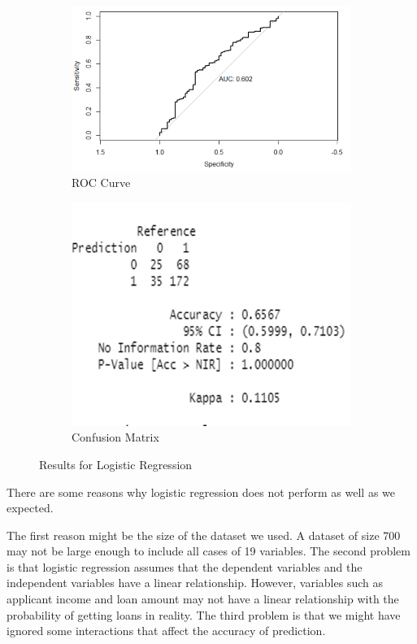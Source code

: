 \documentclass{jpp}
\begin{document}
\begin{figure}
\begin{subfigure}{.5\textwidth}
  \centering
  \includegraphics[width=.9\linewidth]{logistic1.png}  
  \caption{ROC Curve}
\end{subfigure}
\begin{subfigure}{.5\textwidth}
  \centering
  \includegraphics[width=.9\linewidth]{logistic2.png}  
  \caption{Confusion Matrix}
\end{subfigure}
\caption{Results for Logistic Regression}
\label{logistic}
\end{figure}

There are some reasons why logistic regression does not perform as well as we expected. 

The first reason might be the size of the dataset we used. A dataset of size 700 may not be large enough to include all cases of 19 variables. The second problem is that logistic regression assumes that the dependent variables and the independent variables have a linear relationship. However, variables such as applicant income and loan amount may not have a linear relationship with the probability of getting loans in reality. The third problem is that we might have ignored some interactions that affect the accuracy of prediction. 
\end{document}
